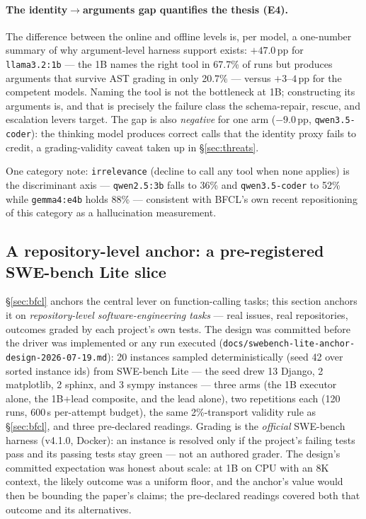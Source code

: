 \documentclass[smallcondensed,natbib]{svjour3}
\begin{document}
\paragraph{The identity$\to$arguments gap quantifies the thesis
(E4).} The difference between the online and offline levels is, per
model, a one-number summary of why argument-level harness support
exists: $+47.0$\,pp for \texttt{llama3.2:1b} --- the 1B names the
right tool in 67.7\% of runs but produces arguments that survive AST
grading in only 20.7\% --- versus $+3$--$4$\,pp for the competent
models. Naming the tool is not the bottleneck at 1B; constructing
its arguments is, and that is precisely the failure class the
schema-repair, rescue, and escalation levers target. The gap is also
\emph{negative} for one arm ($-9.0$\,pp, \texttt{qwen3.5-coder}):
the thinking model produces correct calls that the identity proxy
fails to credit, a grading-validity caveat taken up in
\S\ref{sec:threats}.

One category note: \texttt{irrelevance} (decline to call any tool
when none applies) is the discriminant axis --- \texttt{qwen2.5:3b}
falls to 36\% and \texttt{qwen3.5-coder} to 52\% while
\texttt{gemma4:e4b} holds 88\% --- consistent with BFCL's own recent
repositioning of this category as a hallucination measurement.

\subsection{A repository-level anchor: a pre-registered SWE-bench Lite
slice}\label{sec:swebench}

\S\ref{sec:bfcl} anchors the central lever on function-calling tasks;
this section anchors it on \emph{repository-level software-engineering
tasks} --- real issues, real repositories, outcomes graded by each
project's own tests. The design was committed before the driver was
implemented or any run executed
(\texttt{docs/swebench-lite-anchor-design-2026-07-19.md}): 20
instances sampled deterministically (seed 42 over sorted instance
ids) from SWE-bench Lite \citep{jimenez2024swebench} --- the seed drew
13 Django, 2 matplotlib, 2 sphinx, and 3 sympy instances --- three arms
(the 1B executor alone, the 1B+lead composite, and the lead alone),
two repetitions each (120 runs, 600\,s per-attempt budget), the same
2\%-transport validity rule as \S\ref{sec:bfcl}, and three
pre-declared readings. Grading is the \emph{official} SWE-bench
harness (v4.1.0, Docker): an instance is resolved only if the
project's failing tests pass and its passing tests stay green --- not
an authored grader. The design's committed expectation was honest
about scale: at 1B on CPU with an 8K context, the likely outcome was
a uniform floor, and the anchor's value would then be bounding the
paper's claims; the pre-declared readings covered both that outcome
and its alternatives.
\end{document}
